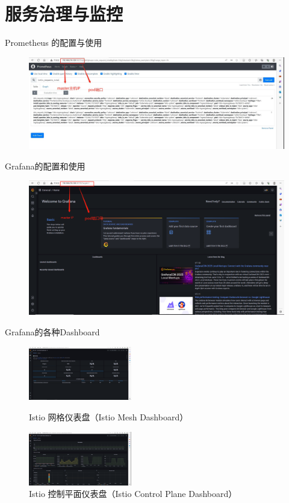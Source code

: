 \documentclass{beamer}
\begin{document}
\section{服务治理与监控}
\begin{frame}{Prometheus 的配置与使用}
\begin{figure}[H]
	\centering
	\includegraphics[width=1.0\textwidth]{pic/prometheus.png}
	\caption{}
\end{figure}
\end{frame}
\begin{frame}{Grafana的配置和使用}
\begin{figure}[H]
	\centering
	\includegraphics[width=1.0\textwidth]{pic/grafana.png}
	\caption{}
\end{figure}
\end{frame}
\begin{frame}{Grafana的各种Dashboard}
\begin{figure}[htbp]
	\centering
	\subfloat
	{\includegraphics[width=0.4\textwidth]{pic/MD.png}
	\caption{Istio 网格仪表盘（Istio Mesh Dashboard）}}
	\subfloat
	{\includegraphics[width=0.4\textwidth]{pic/CPA}
	\caption{Istio 控制平面仪表盘（Istio Control Plane Dashboard）}}
\end{figure}
\end{frame}
\end{document}
